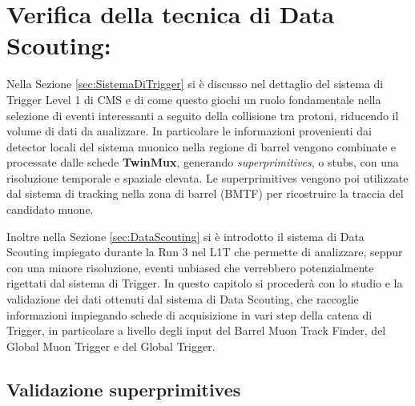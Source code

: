 \chapter{Verifica della tecnica di Data Scouting:}
\label{cap:SecondoCapitolo}

Nella Sezione \ref{sec:SistemaDiTrigger} si è discusso nel dettaglio del sistema di Trigger Level 1 di CMS e di come questo giochi un ruolo fondamentale nella selezione di eventi interessanti a seguito della collisione tra protoni, riducendo il volume di dati da analizzare. In particolare le informazioni provenienti dai detector locali del sistema muonico nella regione di barrel vengono combinate e processate dalle schede \textbf{TwinMux}, generando \textit{superprimitives}, o stubs, con una risoluzione temporale e spaziale elevata. Le superprimitives vengono poi utilizzate dal sistema di tracking nella zona di barrel (BMTF) per ricostruire la traccia del candidato muone.

Inoltre nella Sezione \ref{sec:DataScouting} si è introdotto il sistema di Data Scouting impiegato durante la Run 3 nel L1T che permette di analizzare, seppur con una minore risoluzione, eventi unbiased che verrebbero potenzialmente rigettati dal sistema di Trigger. In questo capitolo si procederà con lo studio e la validazione dei dati ottenuti dal sistema di Data Scouting, che raccoglie informazioni impiegando schede di acquisizione in vari step della catena di Trigger, in particolare a livello degli input del Barrel Muon Track Finder, del Global Muon Trigger e del Global Trigger.


\section{Validazione superprimitives}


